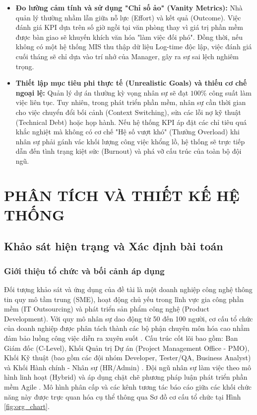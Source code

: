 \documentclass[a4paper,13.5pt]{extreport}
\begin{document}
\begin{itemize}
    \item \textbf{Đo lường cảm tính và sử dụng "Chỉ số ảo" (Vanity Metrics):} Nhà quản lý thường nhầm lẫn giữa nỗ lực (Effort) và kết quả (Outcome). Việc đánh giá KPI dựa trên số giờ ngồi tại văn phòng thay vì giá trị phần mềm được bàn giao sẽ khuyến khích văn hóa "làm việc đối phó". Đồng thời, nếu không có một hệ thống MIS thu thập dữ liệu Log-time độc lập, việc đánh giá cuối tháng sẽ chỉ dựa vào trí nhớ của Manager, gây ra sự sai lệch nghiêm trọng.
    \item \textbf{Thiết lập mục tiêu phi thực tế (Unrealistic Goals) và thiếu cơ chế ngoại lệ:} Quản lý dự án thường kỳ vọng nhân sự sẽ đạt $100\%$ công suất làm việc liên tục. Tuy nhiên, trong phát triển phần mềm, nhân sự cần thời gian cho việc chuyển đổi bối cảnh (Context Switching), sửa các lỗi nợ kỹ thuật (Technical Debt) hoặc họp hành. Nếu hệ thống KPI áp đặt các chỉ tiêu quá khắc nghiệt mà không có cơ chế "Hệ số vượt khó" (Thưởng Overload) khi nhân sự phải gánh vác khối lượng công việc khổng lồ, hệ thống sẽ trực tiếp dẫn đến tình trạng kiệt sức (Burnout) và phá vỡ cấu trúc của toàn bộ đội ngũ.
\end{itemize} 

\chapter{PHÂN TÍCH VÀ THIẾT KẾ HỆ THỐNG}

\section{Khảo sát hiện trạng và Xác định bài toán}
\subsection{Giới thiệu tổ chức và bối cảnh áp dụng}

Đối tượng khảo sát và ứng dụng của đề tài là một doanh nghiệp công nghệ thông tin quy mô tầm trung (SME), hoạt động chủ yếu trong lĩnh vực gia công phần mềm (IT Outsourcing) và phát triển sản phẩm công nghệ (Product Development). Với quy mô nhân sự dao động từ 50 đến 100 người, cơ cấu tổ chức của doanh nghiệp được phân tách thành các bộ phận chuyên môn hóa cao nhằm đảm bảo luồng công việc diễn ra xuyên suốt . Cấu trúc cốt lõi bao gồm: Ban Giám đốc (C-Level), Khối Quản trị Dự án (Project Management Office - PMO), Khối Kỹ thuật (bao gồm các đội nhóm Developer, Tester/QA, Business Analyst) và Khối Hành chính - Nhân sự (HR/Admin) . Đội ngũ nhân sự làm việc theo mô hình linh hoạt (Hybrid) và áp dụng chặt chẽ phương pháp luận phát triển phần mềm Agile . Mô hình phân cấp và các kênh tương tác báo cáo giữa các khối chức năng này được trực quan hóa cụ thể thông qua Sơ đồ cơ cấu tổ chức tại Hình \ref{fig:org_chart}.
\end{document}
